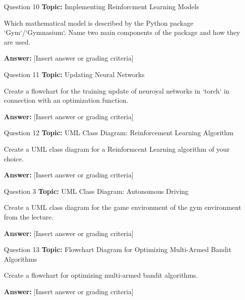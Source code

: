 \begin{frame}{Question 10}
    \textbf{Topic:} Implementing Reinforcment Learning Models
    \vspace{10pt}

    Which mathematical model is described by the Python package `Gym`/`Gymnasium`. Name two main components of the package and how they are used. 
    \vspace{20pt}

    \textbf{Answer:} [Insert answer or grading criteria]
\end{frame}

\begin{frame}{Question 11}
    \textbf{Topic:} Updating Neural Networks
    \vspace{10pt}

    Create a flowchart for the training update of neuroyal networks in `torch` in connection with an optimization function.
    \vspace{20pt}

    \textbf{Answer:} [Insert answer or grading criteria]
\end{frame}

\begin{frame}{Question 12}
    \textbf{Topic:} UML Class Diagram: Reinforcement Learning Algorithm
    \vspace{10pt}

    Create a UML class diagram for a Reinformcent Learning algorithm of your choice. 
    \vspace{20pt}

    \textbf{Answer:} [Insert answer or grading criteria]
\end{frame}

\begin{frame}{Question 3}
    \textbf{Topic:} UML Class Diagram: Autonomous Driving
    \vspace{10pt}

    Create a UML class diagram for the game environment of the gym environment from the lecture.
    \vspace{20pt}

    \textbf{Answer:} [Insert answer or grading criteria]
\end{frame}

\begin{frame}{Question 13}
    \textbf{Topic:} Flowchart Diagram for Optimizing Multi-Armed Bandit Algorithms
    \vspace{10pt}

    Create a flowchart for optimizing multi-armed bandit algorithms. 
    \vspace{20pt}

    \textbf{Answer:} [Insert answer or grading criteria]
\end{frame}

